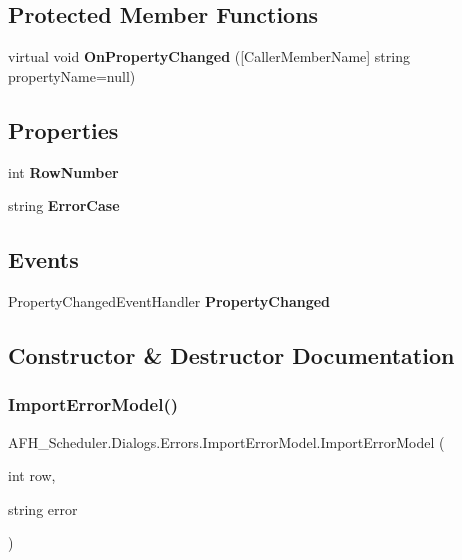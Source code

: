 \subsection*{Protected Member Functions}
\begin{DoxyCompactItemize}
\item 
virtual void \textbf{ On\+Property\+Changed} ([Caller\+Member\+Name] string property\+Name=null)
\end{DoxyCompactItemize}
\subsection*{Properties}
\begin{DoxyCompactItemize}
\item 
int \textbf{ Row\+Number}\hspace{0.3cm}{\ttfamily  [get, set]}
\item 
string \textbf{ Error\+Case}\hspace{0.3cm}{\ttfamily  [get, set]}
\end{DoxyCompactItemize}
\subsection*{Events}
\begin{DoxyCompactItemize}
\item 
Property\+Changed\+Event\+Handler \textbf{ Property\+Changed}
\end{DoxyCompactItemize}


\subsection{Constructor \& Destructor Documentation}
\mbox{\label{class_a_f_h___scheduler_1_1_dialogs_1_1_errors_1_1_import_error_model_afeea5f03ef98c1c857f56dec82ac16e7}} 
\subsubsection{ImportErrorModel()}
{\footnotesize\ttfamily A\+F\+H\+\_\+\+Scheduler.\+Dialogs.\+Errors.\+Import\+Error\+Model.\+Import\+Error\+Model (\begin{DoxyParamCaption}\item[{int}]{row,  }\item[{string}]{error }\end{DoxyParamCaption})}



